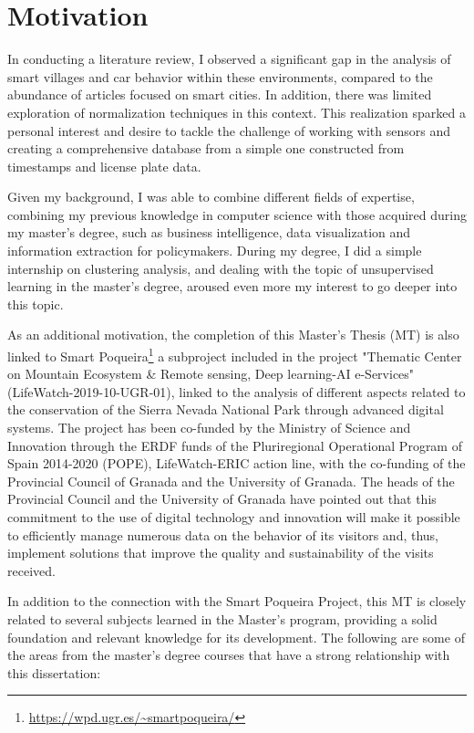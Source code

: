\section{Motivation}

In conducting a literature review, I observed a significant gap in the analysis of smart villages and car behavior within these environments, compared to the abundance of articles focused on smart cities. In addition, there was limited exploration of normalization techniques in this context. This realization sparked a personal interest and desire to tackle the challenge of working with sensors and creating a comprehensive database from a simple one constructed from timestamps and license plate data.

Given my background, I was able to combine different fields of expertise, combining my previous knowledge in computer science with those acquired during my master's degree, such as business intelligence, data visualization and information extraction for policymakers. During my degree, I did a simple internship on clustering analysis, and dealing with the topic of unsupervised learning in the master's degree, aroused even more my interest to go deeper into this topic.

As an additional motivation, the completion of this Master's Thesis (MT) is also linked to Smart Poqueira\footnote{\url{https://wpd.ugr.es/~smartpoqueira/}} a subproject included in the project "Thematic Center on Mountain Ecosystem \& Remote sensing, Deep learning-AI e-Services" (LifeWatch-2019-10-UGR-01), linked to the analysis of different aspects related to the conservation of the Sierra Nevada National Park through advanced digital systems. The project has been co-funded by the Ministry of Science and Innovation through the ERDF funds of the Pluriregional Operational Program of Spain 2014-2020 (POPE), LifeWatch-ERIC action line, with the co-funding of the Provincial Council of Granada and the University of Granada. The heads of the Provincial Council and the University of Granada have pointed out that this commitment to the use of digital technology and innovation will make it possible to efficiently manage numerous data on the behavior of its visitors and, thus, implement solutions that improve the quality and sustainability of the visits received.

In addition to the connection with the Smart Poqueira Project, this MT is closely related to several subjects learned in the Master's program, providing a solid foundation and relevant knowledge for its development. The following are some of the areas from the master's degree courses that have a strong relationship with this dissertation:

